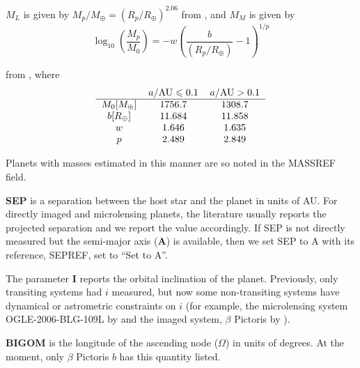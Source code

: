 \documentclass[11pt,preprint]{aastex}
\def\leq{\leqslant}
\def\rearth{R_\oplus}
\def\mearth{M_\oplus}
\begin{document}
\begin{CJK*}{UTF8}{gbsn}
$M_L$ is given by $M_{p}/\mearth=\left(R_{p}/\rearth\right)^{2.06}$ from \cite{Lissauer2011}, and $M_M$ is given by 
\[
\log_{10}\left(\frac{M_{p}}{M_0}\right)=-w\left(\frac{b}{\left(R_{p}/\rearth\right)}-1\right)^{1/p}
\]

\noindent from \cite{Mordasini2012}, where
\[
\begin{tabular}{ c c c }
  & $a/{\rm AU} \leq 0.1$ & $a/{\rm AU} > 0.1$  \\ \hline $M_0[\mearth]$ & 1756.7 & 1308.7 \\
$b[\rearth]$ & 11.684 & 11.858 \\ $w$ & 1.646 & 1.635 \\ $p$ & 2.489 & 2.849 \\ 
\end{tabular}
\]

Planets with masses estimated in this manner are so noted in the
MASSREF field.

{\bf SEP} is a separation between the host star
and the planet in units of AU. For directly imaged and microlensing planets, the
literature usually reports the projected separation and we report the
value accordingly.  If SEP is not directly measured but the semi-major
axis ({\bf A}) is available, then we set SEP to A with its reference,
SEPREF, set to ``Set to A''. 

The parameter {\bf I} reports the orbital inclination of the planet. Previously,
only transiting systems had $i$ measured, but now some non-transiting
systems have dynamical or astrometric constraints on $i$ (for example,
the microlensing system OGLE-2006-BLG-109L by \citealt{Bennett2010}
and the imaged system, $\beta$ Pictoris by \citealt{Lagrange2009}).

{\bf BIGOM} is the longitude of the ascending node ($\Omega$) in units
of degrees. At the moment, only $\beta$ Pictoris $b$ has this quantity listed.


\end{CJK*}
\end{document}
